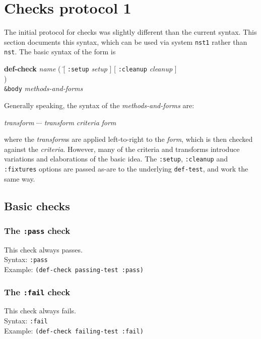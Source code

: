 \documentclass{article}
\begin{document}
\appendix

\section{Checks protocol 1}
The initial protocol for checks was slightly different than the current syntax.  This section documents this syntax, which can be used via system \texttt{nst1} rather than \texttt{nst}.
The basic syntax of
the form is
\begin{tabbing}\hspace*{1cm}
\textbf{de}\=\textbf{f-check} \textit{name}
	( \= [ \texttt{:setup} \textit{setup} ]
	     [ \texttt{:cleanup} \textit{cleanup} ]
\\ \> )
\\ \> \texttt{\&body} \textit{methods-and-forms}
\end{tabbing}
Generally speaking, the syntax of the \textit{methods-and-forms} are:
\begin{center}
\textit{transform} $\cdots$ \textit{transform} \textit{criteria} \textit{form}
\end{center}
where the \emph{transform}s are applied left-to-right to the
\emph{form}, which is then checked against the \emph{criteria}.
However, many of the criteria and transforms introduce variations and
elaborations of the basic idea.  The \texttt{:setup},
\texttt{:cleanup} and \texttt{:fixtures} options are passed as-are to
the underlying \texttt{def-test}, and work the same way.
\subsection{Basic checks}
\subsubsection{The \texttt{:pass} check} 
This check always passes.
\\ Syntax: \texttt{:pass}
\\ Example: \texttt{(def-check passing-test :pass)}

\subsubsection{The \texttt{:fail} check} 
This check always fails.
\\ Syntax: \texttt{:fail}
\\ Example: \texttt{(def-check failing-test :fail)}
\end{document}
